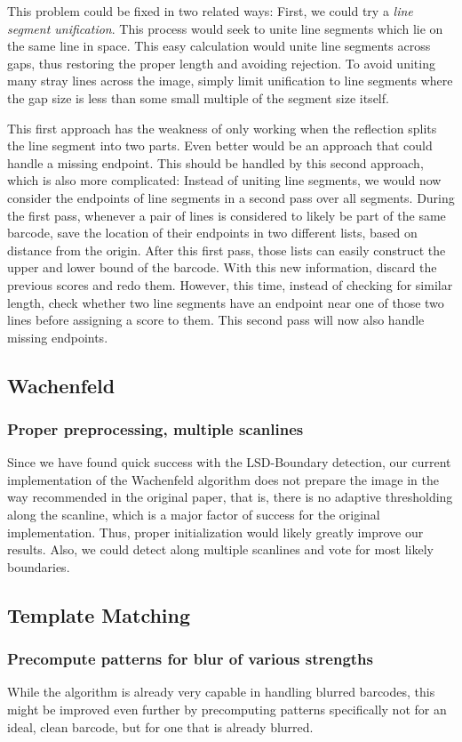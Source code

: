 This problem could be fixed in two related ways: First, we could try a \emph{line segment unification}. This process would seek to unite line segments which lie on the same line in space. This easy calculation would unite line segments across gaps, thus restoring the proper length and avoiding rejection. To avoid uniting many stray lines across the image, simply limit unification to line segments where the gap size is less than some small multiple of the segment size itself.

This first approach has the weakness of only working when the reflection splits the line segment into two parts. Even better would be an approach that could handle a missing endpoint. This should be handled by this second approach, which is also more complicated: Instead of uniting line segments, we would now consider the endpoints of line segments in a second pass over all segments. During the first pass, whenever a pair of lines is considered to likely be part of the same barcode, save the location of their endpoints in two different lists, based on distance from the origin. After this first pass, those lists can easily construct the upper and lower bound of the barcode. With this new information, discard the previous scores and redo them. However, this time, instead of checking for similar length, check whether two line segments have an endpoint near one of those two lines before assigning a score to them. This second pass will now also handle missing endpoints.

\subsection{Wachenfeld}
\subsubsection{Proper preprocessing, multiple scanlines}

Since we have found quick success with the LSD-Boundary detection, our current implementation of the Wachenfeld algorithm does not prepare the image in the way recommended in the original paper, that is, there is no adaptive thresholding along the scanline, which is a major factor of success for the original implementation. Thus, proper initialization would likely greatly improve our results. Also, we could detect along multiple scanlines and vote for most likely boundaries.

\subsection{Template Matching}
\subsubsection{Precompute patterns for blur of various strengths}

While the algorithm is already very capable in handling blurred barcodes, this might be improved even further by precomputing patterns specifically not for an ideal, clean barcode, but for one that is already blurred.
